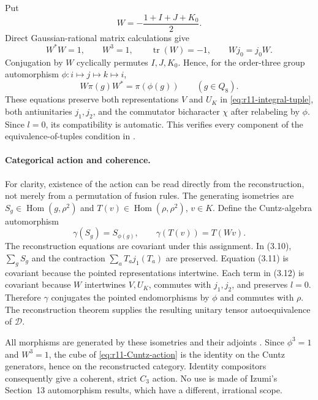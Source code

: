 \documentclass[11pt,a4paper]{article}
\begin{document}
Put
\begin{equation}\label{eq:r11-order-three-W}
 W=-\frac{1+I+J+K_0}{2}.
\end{equation}
Direct Gaussian-rational matrix calculations give
\[
 W^*W=1,\qquad W^3=1,\qquad \operatorname{tr}(W)=-1,
 \qquad Wj_0=j_0W.
\]
Conjugation by $W$ cyclically permutes $I,J,K_0$. Hence, for the order-three
group automorphism $\phi:i\mapsto j\mapsto k\mapsto i$,
\[
 W\pi(g)W^*=\pi(\phi(g))\qquad(g\in Q_8).
\]
These equations preserve both representations $V$ and $U_K$ in
\eqref{eq:r11-integral-tuple}, both antiunitaries $j_1,j_2$, and the
commutator bicharacter $\chi$ after relabeling by $\phi$. Since $l=0$, its
compatibility is automatic. This verifies every component of the
equivalence-of-tuples condition in \cite[Definition~4.8]{Izumi}.

\paragraph{Categorical action and coherence.}
For clarity, existence of the action can be read directly from the
reconstruction, not merely from a permutation of fusion rules.
The generating isometries are
$S_g\in\operatorname{Hom}(g,\rho^2)$ and
$T(v)\in\operatorname{Hom}(\rho,\rho^2)$, $v\in K$.
Define the Cuntz-algebra automorphism
\begin{equation}\label{eq:r11-Cuntz-action}
 \gamma(S_g)=S_{\phi(g)},\qquad
 \gamma(T(v))=T(Wv).
\end{equation}
The reconstruction equations \cite[(3.10)--(3.12)]{Izumi} are covariant
under this assignment. In (3.10), $\sum_gS_g$ and the contraction
$\sum_a T_a j_1(T_a)$ are preserved. Equation (3.11) is covariant because
the pointed representations intertwine. Each term in (3.12) is covariant
because $W$ intertwines $V,U_K$, commutes with $j_1,j_2$, and preserves
$l=0$. Therefore $\gamma$ conjugates the pointed endomorphisms by $\phi$
and commutes with $\rho$. The reconstruction theorem
\cite[Theorem~4.9]{Izumi} supplies the resulting unitary tensor
autoequivalence of $\mathcal D$.

All morphisms are generated by these isometries and their adjoints
\cite[Remark~3.6]{Izumi}. Since $\phi^3=1$ and $W^3=1$, the cube of
\eqref{eq:r11-Cuntz-action} is the identity on the Cuntz generators,
hence on the reconstructed category. Identity compositors consequently
give a coherent, strict $C_3$ action. No use is made of Izumi's Section~13
automorphism results, which have a different, irrational scope.
\end{document}
